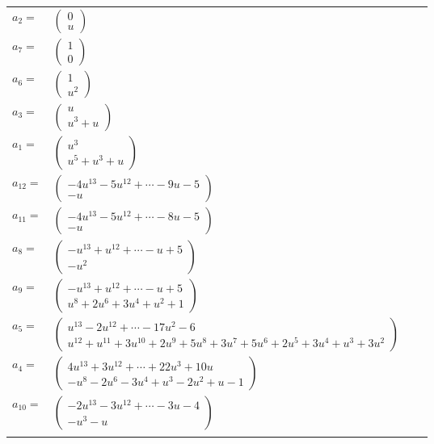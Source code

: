 \documentclass[1p]{elsarticle_modified}
\theoremstyle{definition}
\begin{document}
\begin{tabular}{m{7pt} m{180pt} m{7pt} m{180pt} }
\flushright $a_{2}=$&$\begin{pmatrix}0\\u\end{pmatrix}$ \\
\flushright $a_{7}=$&$\begin{pmatrix}1\\0\end{pmatrix}$ \\
\flushright $a_{6}=$&$\begin{pmatrix}1\\u^2\end{pmatrix}$ \\
\flushright $a_{3}=$&$\begin{pmatrix}u\\u^3+u\end{pmatrix}$ \\
\flushright $a_{1}=$&$\begin{pmatrix}u^3\\u^5+u^3+u\end{pmatrix}$ \\
\flushright $a_{12}=$&$\begin{pmatrix}-4 u^{13}-5 u^{12}+\cdots-9 u-5\\- u\end{pmatrix}$ \\
\flushright $a_{11}=$&$\begin{pmatrix}-4 u^{13}-5 u^{12}+\cdots-8 u-5\\- u\end{pmatrix}$ \\
\flushright $a_{8}=$&$\begin{pmatrix}- u^{13}+u^{12}+\cdots- u+5\\- u^2\end{pmatrix}$ \\
\flushright $a_{9}=$&$\begin{pmatrix}- u^{13}+u^{12}+\cdots- u+5\\u^8+2 u^6+3 u^4+u^2+1\end{pmatrix}$ \\
\flushright $a_{5}=$&$\begin{pmatrix}u^{13}-2 u^{12}+\cdots-17 u^2-6\\u^{12}+u^{11}+3 u^{10}+2 u^9+5 u^8+3 u^7+5 u^6+2 u^5+3 u^4+u^3+3 u^2\end{pmatrix}$ \\
\flushright $a_{4}=$&$\begin{pmatrix}4 u^{13}+3 u^{12}+\cdots+22 u^3+10 u\\- u^8-2 u^6-3 u^4+u^3-2 u^2+u-1\end{pmatrix}$ \\
\flushright $a_{10}=$&$\begin{pmatrix}-2 u^{13}-3 u^{12}+\cdots-3 u-4\\- u^3- u\end{pmatrix}$\\&\end{tabular}
\end{document}
